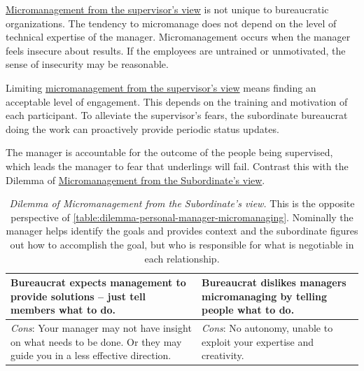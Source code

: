 \hyperref[table:dilemma-personal-manager-micromanaging]{Micromanagement from the supervisor's view} is not unique to bureaucratic organizations. The tendency to micromanage does not depend on the level of technical expertise of the manager. Micromanagement occurs when the manager feels insecure about results. If the employees are untrained or unmotivated, the sense of insecurity may be reasonable.

Limiting \hyperref[table:dilemma-personal-manager-micromanaging]{micromanagement from the supervisor's view} means finding an acceptable level of engagement. This depends on the training and motivation of each participant. To alleviate the supervisor's fears, the subordinate bureaucrat doing the work can proactively provide periodic status updates. 

The manager is accountable for the outcome of the people being supervised, which leads the manager to fear that underlings will fail.  Contrast this with the Dilemma of  \hyperref[table:dilemma-personal-solution-provider]{Micromanagement from the Subordinate’s view}.

\begin{center}
\begin{table}[H] %
\begin{tabular}{ | m{\dilemmatablewidth}| m{\dilemmatablewidth} | } 
  \hline
  \textbf{Bureaucrat expects management to provide solutions -- just tell members what to do.} & 
  \textbf{Bureaucrat dislikes managers micromanaging by telling people what to do.} \\ 
  \hline
  \textit{Cons}: Your manager may not have insight on what needs to be done. Or they may guide you in a less effective direction. &
  \textit{Cons}: No autonomy, unable to exploit your expertise and creativity. \\  
  \hline
\end{tabular}
\caption{\textit{Dilemma of Micromanagement from the Subordinate's view.}
This is the opposite perspective of \ref{table:dilemma-personal-manager-micromanaging}. Nominally the manager helps identify the goals and provides context and the subordinate figures out how to accomplish the goal, but who is responsible for what is negotiable in each relationship.
}
\label{table:dilemma-personal-solution-provider}
\end{table}
\end{center}

